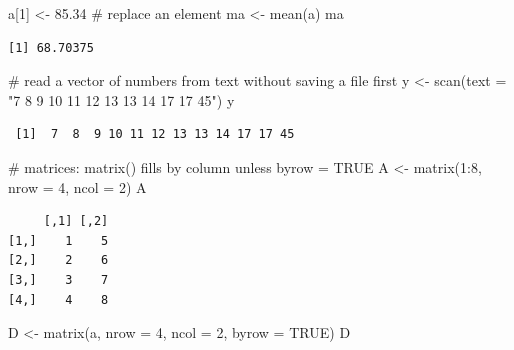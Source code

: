 \documentclass[
  letterpaper,
  DIV=11,
  numbers=noendperiod]{scrreprt}
\newenvironment{Shaded}{\begin{snugshade}}{\end{snugshade}}
\newcommand{\AttributeTok}[1]{\textcolor[rgb]{0.40,0.45,0.13}{#1}}
\newcommand{\CommentTok}[1]{\textcolor[rgb]{0.37,0.37,0.37}{#1}}
\newcommand{\ConstantTok}[1]{\textcolor[rgb]{0.56,0.35,0.01}{#1}}
\newcommand{\DecValTok}[1]{\textcolor[rgb]{0.68,0.00,0.00}{#1}}
\newcommand{\FloatTok}[1]{\textcolor[rgb]{0.68,0.00,0.00}{#1}}
\newcommand{\FunctionTok}[1]{\textcolor[rgb]{0.28,0.35,0.67}{#1}}
\newcommand{\NormalTok}[1]{\textcolor[rgb]{0.00,0.23,0.31}{#1}}
\newcommand{\OtherTok}[1]{\textcolor[rgb]{0.00,0.23,0.31}{#1}}
\newcommand{\SpecialCharTok}[1]{\textcolor[rgb]{0.37,0.37,0.37}{#1}}
\newcommand{\StringTok}[1]{\textcolor[rgb]{0.13,0.47,0.30}{#1}}
\renewcommand{\[}{\begin{equation}}
\renewcommand{\]}{\end{equation}}
\begin{document}
\begin{Shaded}
\begin{Highlighting}[]
\NormalTok{a[}\DecValTok{1}\NormalTok{] }\OtherTok{\textless{}{-}} \FloatTok{85.34}   \CommentTok{\# replace an element}
\NormalTok{ma }\OtherTok{\textless{}{-}} \FunctionTok{mean}\NormalTok{(a)}
\NormalTok{ma}
\end{Highlighting}
\end{Shaded}

\begin{verbatim}
[1] 68.70375
\end{verbatim}

\begin{Shaded}
\begin{Highlighting}[]
\CommentTok{\# read a vector of numbers from text without saving a file first}
\NormalTok{y }\OtherTok{\textless{}{-}} \FunctionTok{scan}\NormalTok{(}\AttributeTok{text =} \StringTok{"7 8 9 10 11 12 13 13 14 17 17 45"}\NormalTok{)}
\NormalTok{y}
\end{Highlighting}
\end{Shaded}

\begin{verbatim}
 [1]  7  8  9 10 11 12 13 13 14 17 17 45
\end{verbatim}

\begin{Shaded}
\begin{Highlighting}[]
\CommentTok{\# matrices: matrix() fills by column unless byrow = TRUE}
\NormalTok{A }\OtherTok{\textless{}{-}} \FunctionTok{matrix}\NormalTok{(}\DecValTok{1}\SpecialCharTok{:}\DecValTok{8}\NormalTok{, }\AttributeTok{nrow =} \DecValTok{4}\NormalTok{, }\AttributeTok{ncol =} \DecValTok{2}\NormalTok{)}
\NormalTok{A}
\end{Highlighting}
\end{Shaded}

\begin{verbatim}
     [,1] [,2]
[1,]    1    5
[2,]    2    6
[3,]    3    7
[4,]    4    8
\end{verbatim}

\begin{Shaded}
\begin{Highlighting}[]
\NormalTok{D }\OtherTok{\textless{}{-}} \FunctionTok{matrix}\NormalTok{(a, }\AttributeTok{nrow =} \DecValTok{4}\NormalTok{, }\AttributeTok{ncol =} \DecValTok{2}\NormalTok{, }\AttributeTok{byrow =} \ConstantTok{TRUE}\NormalTok{)}
\NormalTok{D}
\end{Highlighting}
\end{Shaded}
\end{document}
